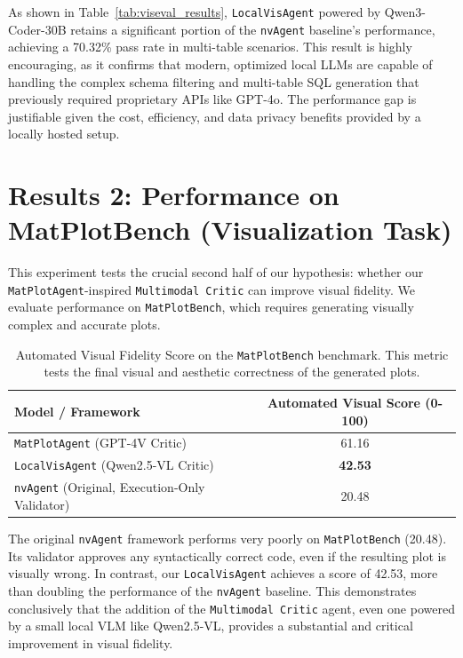 \documentclass[a4paper,oneside,bibliography=totoc]{scrbook}
\begin{document}
As shown in Table~\ref{tab:viseval_results}, \texttt{LocalVisAgent} powered by Qwen3-Coder-30B retains a significant portion of the \texttt{nvAgent} baseline's performance, achieving a 70.32\% pass rate in multi-table scenarios. This result is highly encouraging, as it confirms that modern, optimized local LLMs are capable of handling the complex schema filtering and multi-table SQL generation that previously required proprietary APIs like GPT-4o. The performance gap is justifiable given the cost, efficiency, and data privacy benefits provided by a locally hosted setup.

\section{Results 2: Performance on MatPlotBench (Visualization Task)}
\label{sec:results_matplotbench}

This experiment tests the crucial second half of our hypothesis: whether our \texttt{MatPlotAgent}-inspired \texttt{Multimodal Critic} can improve visual fidelity. We evaluate performance on \texttt{MatPlotBench}, which requires generating visually complex and accurate plots.

\begin{table}[tb]
 \centering
 \begin{tabular}{lc}
 \toprule
 \textbf{Model / Framework} & \textbf{Automated Visual Score (0-100)} \\
 \midrule
 \texttt{MatPlotAgent} (GPT-4V Critic) \cite{yang2024matplotagent} & 61.16 \\
 \texttt{LocalVisAgent} (Qwen2.5-VL Critic) & \textbf{42.53} \\
 \texttt{nvAgent} (Original, Execution-Only Validator) & 20.48 \\
 \bottomrule
 \end{tabular}
 \caption{Automated Visual Fidelity Score on the \texttt{MatPlotBench} benchmark. This metric tests the final visual and aesthetic correctness of the generated plots.}
 \label{tab:matplotbench_results}
\end{table}

The original \texttt{nvAgent} framework performs very poorly on \texttt{MatPlotBench} (20.48). Its validator approves any syntactically correct code, even if the resulting plot is visually wrong. In contrast, our \texttt{LocalVisAgent} achieves a score of 42.53, more than doubling the performance of the \texttt{nvAgent} baseline. This demonstrates conclusively that the addition of the \texttt{Multimodal Critic} agent, even one powered by a small local VLM like Qwen2.5-VL, provides a substantial and critical improvement in visual fidelity.
\end{document}
